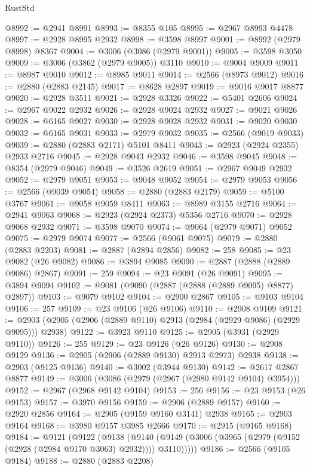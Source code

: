 \begin{lexlean}{RustStd}
\begin{coremodule}
{\begin{coremodule}
{{{{{{{{{{{{{{{{{{{{{{{{{{{{{{{{{{{{{{{{{{{{{{{{{{{{{{{{{{{{{{{{{{{{{{{{{{{{{{@8992 := @2941 @8991
@8993 := @8355 @105
@8995 := @2967 @8993 @4478
@8997 := @2928 @8995 @2932
@8998 := @3598 @8997
@9001 := @8992 (@2979 @8998) @8367
@9004 := @3006 (@3086 (@2979 @9001))
@9005 := @3598 @3050
@9009 := @3006 (@3862 (@2979 @9005)) @3110
@9010 := @9004 @9009
@9011 := @8987 @9010
@9012 := @8985 @9011
@9014 := @2566 (@8973 @9012)
@9016 := @2880 (@2883 @2145)
@9017 := @8628 @2897
@9019 := @9016 @9017 @8877
@9020 := @2928 @3511
@9021 := @2928 @3326
@9022 := @5401 @2606
@9024 := @2967 @9022 @2932
@9026 := @2928 @9024 @2932
@9027 := @9021 @9026
@9028 := @6165 @9027
@9030 := @2928 @9028 @2932
@9031 := @9020 @9030
@9032 := @6165 @9031
@9033 := @2979 @9032
@9035 := @2566 (@9019 @9033)
@9039 := @2880 (@2883 @2171) @5101 @8411
@9043 := @2923 (@2924 @2355) @2933 @2716
@9045 := @2928 @9043 @2932
@9046 := @3598 @9045
@9048 := @8354 (@2979 @9046)
@9049 := @3526 @2619
@9051 := @2967 @9049 @2932
@9052 := @2979 @9051
@9053 := @9048 @9052
@9054 := @2979 @9053
@9056 := @2566 (@9039 @9054)
@9058 := @2880 (@2883 @2179)
@9059 := @5100 @3767
@9061 := @9058 @9059 @8411
@9063 := @8989 @3155 @2716
@9064 := @2941 @9063
@9068 := @2923 (@2924 @2373) @5356 @2716
@9070 := @2928 @9068 @2932
@9071 := @3598 @9070
@9074 := @9064 (@2979 @9071) @9052
@9075 := @2979 @9074
@9077 := @2566 (@9061 @9075)
@9079 := @2880 (@2883 @2203)
@9081 := @2887 (@2894 @2856)
@9082 := 258
@9085 := @23 @9082 (@26 @9082)
@9086 := @3894 @9085
@9090 := @2887 (@2888 (@2889 @9086) @2867)
@9091 := 259
@9094 := @23 @9091 (@26 @9091)
@9095 := @3894 @9094
@9102 := @9081 (@9090 (@2887 (@2888 (@2889 @9095) @8877) @2897))
@9103 := @9079 @9102
@9104 := @2900 @2867
@9105 := @9103 @9104
@9106 := 257
@9109 := @23 @9106 (@26 @9106)
@9110 := @2908 @9109
@9121 := @2903 (@2905 (@2906 (@2889 @9110) @2913 (@2984 (@2929 @9086) (@2929 @9095))) @2938)
@9122 := @3923 @9110
@9125 := @2905 (@3931 (@2929 @9110))
@9126 := 255
@9129 := @23 @9126 (@26 @9126)
@9130 := @2908 @9129
@9136 := @2905 (@2906 (@2889 @9130) @2913 @2973) @2938
@9138 := @2903 (@9125 @9136)
@9140 := @3002 (@3944 @9130)
@9142 := @2617 @2867 @8877
@9149 := @3006 (@3086 (@2979 (@2967 (@2980 @9142 @9104) @3954)))
@9152 := @2967 (@2968 @9142 @9104)
@9153 := 256
@9156 := @23 @9153 (@26 @9153)
@9157 := @3970 @9156
@9159 := @2906 (@2889 @9157)
@9160 := @2920 @2856
@9164 := @2905 (@9159 @9160 @3141) @2938
@9165 := @2903 @9164
@9168 := @3980 @9157 @3985 @2666
@9170 := @2915 (@9165 @9168)
@9184 := @9121
    (@9122
      (@9138
        (@9140 (@9149 (@3006 (@3965 (@2979 (@9152 (@2928 (@2984 @9170 @3063) @2932)))) @3110)))))
@9186 := @2566 (@9105 @9184)
@9188 := @2880 (@2883 @2208)
}}}}}}}}}}}}}}}}}}}}}}}}}}}}}}}}}}}}}}}}}}}}}}}}}}}}}}}}}}}}}}}}}}}}}}}}}}}}}}
\end{coremodule}}
\end{coremodule}
\end{lexlean}
